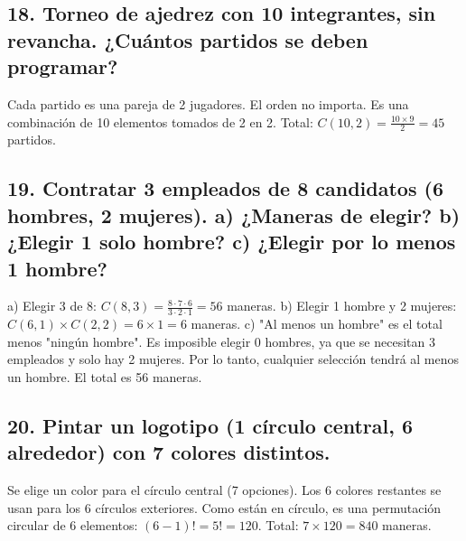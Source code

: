\documentclass[11pt]{article}
\begin{document}
    \subsection*{18. Torneo de ajedrez con 10 integrantes, sin revancha. ¿Cuántos partidos se deben programar?}
    Cada partido es una pareja de 2 jugadores. El orden no importa. Es una combinación de 10 elementos tomados de 2 en 2.
    Total: $C(10,2) = \frac{10 \times 9}{2} = 45$ partidos.

    \subsection*{19. Contratar 3 empleados de 8 candidatos (6 hombres, 2 mujeres). a) ¿Maneras de elegir? b) ¿Elegir 1 solo hombre? c) ¿Elegir por lo menos 1 hombre?}
    a) Elegir 3 de 8: $C(8,3) = \frac{8 \cdot 7 \cdot 6}{3 \cdot 2 \cdot 1} = 56$ maneras.
    b) Elegir 1 hombre y 2 mujeres: $C(6,1) \times C(2,2) = 6 \times 1 = 6$ maneras.
    c) "Al menos un hombre" es el total menos "ningún hombre". Es imposible elegir 0 hombres, ya que se necesitan 3 empleados y solo hay 2 mujeres. Por lo tanto, cualquier selección tendrá al menos un hombre. El total es 56 maneras.

    \subsection*{20. Pintar un logotipo (1 círculo central, 6 alrededor) con 7 colores distintos.}
    Se elige un color para el círculo central (7 opciones).
    Los 6 colores restantes se usan para los 6 círculos exteriores. Como están en círculo, es una permutación circular de 6 elementos: $(6-1)! = 5! = 120$.
    Total: $7 \times 120 = 840$ maneras.
    
\end{document}
